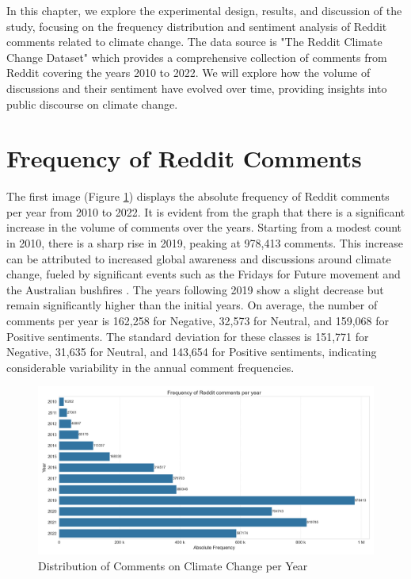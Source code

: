 In this chapter, we explore the experimental design, results, and discussion of the study, focusing on the frequency distribution and sentiment analysis of Reddit comments related to climate change. The data source is "The Reddit Climate Change Dataset" which provides a comprehensive collection of comments from Reddit covering the years 2010 to 2022. We will explore how the volume of discussions and their sentiment have evolved over time, providing insights into public discourse on climate change.

\section{Frequency of Reddit Comments}
The first image (Figure \ref{fig:all_samples}) displays the absolute frequency of Reddit comments per year from 2010 to 2022. It is evident from the graph that there is a significant increase in the volume of comments over the years. Starting from a modest count in 2010, there is a sharp rise in 2019, peaking at 978,413 comments. This increase can be attributed to increased global awareness and discussions around climate change, fueled by significant events such as the Fridays for Future movement \cite{context2024greta,greenhouse2024greta} and the Australian bushfires \cite{wwf2024bushfires}. The years following 2019 show a slight decrease but remain significantly higher than the initial years. On average, the number of comments per year is 162,258 for Negative, 32,573 for Neutral, and 159,068 for Positive sentiments. The standard deviation for these classes is 151,771 for Negative, 31,635 for Neutral, and 143,654 for Positive sentiments, indicating considerable variability in the annual comment frequencies.
\begin{figure}[h]    
    \includegraphics[width=\textwidth]{images/overview/samples_all.png}
    \caption{Distribution of Comments on Climate Change per Year}
    \label{fig:all_samples}
\end{figure}
